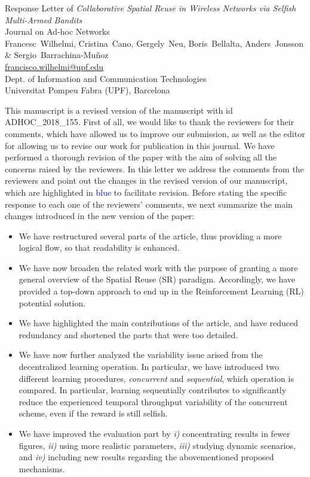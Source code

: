 \documentclass[a4paper,twoside,11pt]{reviewresponse}
\makeatletter
\newcommand{\myAuthors}{Francesc~Wilhelmi, Cristina~Cano, Gergely~Neu, Boris~Bellalta,  Anders~Jonsson \&  Sergio~Barrachina-Mu\~noz}
\newcommand{\myEmail}{francisco.wilhelmi@upf.edu}
\newcommand{\myTitle}{Response Letter of \textit{Collaborative Spatial Reuse in Wireless Networks via Selfish Multi-Armed Bandits}}
\newcommand{\myJournal}{Journal on Ad-hoc Networks}
\newcommand{\myDept}{Dept. of Information and Communication Technologies \\ Universitat Pompeu Fabra (UPF), Barcelona}
\makeatother
\begin{document}
	
\thispagestyle{plain}

\begin{center}
	{\LARGE\myTitle} \vspace{0.5cm} \\
	{\large\myJournal} \vspace{0.5cm} \\
	\myAuthors \\
	\url{\myEmail} \vspace{0.3cm} \\
	\myDept
\end{center}

\medskip

\medskip

This manuscript is a revised version of the manuscript with id ADHOC\_2018\_155. First of all, we would like to thank the reviewers for their comments, which have allowed us to improve our submission, as well as the editor for allowing us to revise our work for publication in this journal. We have performed a thorough revision of the paper with the aim of solving all the concerns raised by the reviewers. In this letter we address the comments from the reviewers and point out the changes in the revised version of our manuscript, which are highlighted in \textcolor{blue}{blue} to facilitate revision. Before stating the specific response to each one of the reviewers’ comments, we next summarize the main changes introduced in the new version of the paper:

\begin{itemize}
    \item We have restructured several parts of the article, thus providing a more logical flow, so that readability is enhanced.
    \item We have now broaden the related work with the purpose of granting a more general overview of the Spatial Reuse (SR) paradigm. Accordingly, we have provided a top-down approach to end up in the Reinforcement Learning (RL) potential solution.
    \item We have highlighted the main contributions of the article, and have reduced redundancy and shortened the parts that were too detailed.
    \item We have now further analyzed the variability issue arised from the decentralized learning operation. In particular, we have introduced two different learning procedures, \textit{concurrent} and \textit{sequential}, which operation is compared. In particular, learning sequentially contributes to significantly reduce the experienced temporal throughput variability of the concurrent scheme, even if the reward is still selfish.
    \item We have improved the evaluation part by \emph{i)} concentrating results in fewer figures, \emph{ii)} using more realistic parameters, \emph{iii)} studying dynamic scenarios, and \emph{iv)} including new results regarding the abovementioned proposed mechanisms.
\end{itemize}
\end{document}
